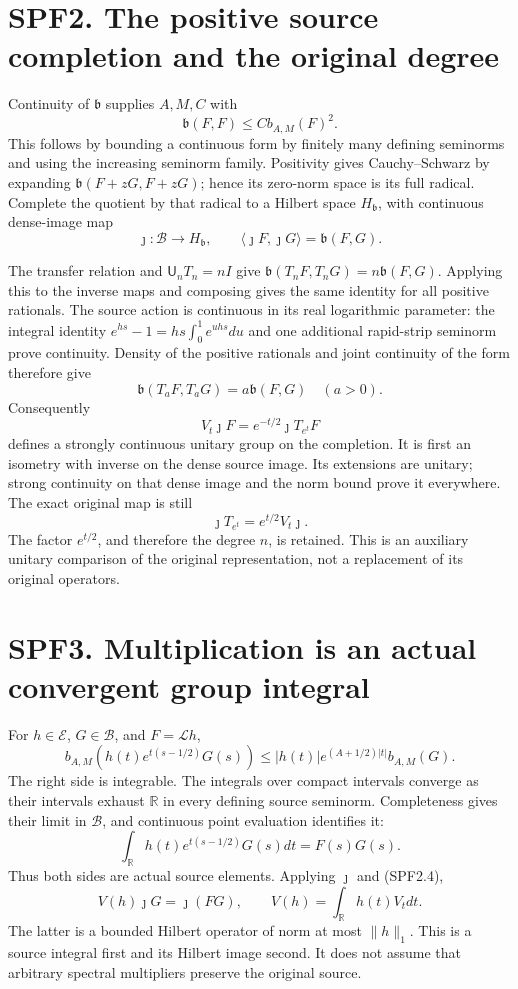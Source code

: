 \section{SPF2. The positive source completion and the original
degree}\label{spf2.-the-positive-source-completion-and-the-original-degree}

Continuity of \(\mathfrak b\) supplies \(A,M,C\) with \[
\mathfrak b(F,F)\le C b_{A,M}(F)^2.
\tag{SPF2.1}
\] This follows by bounding a continuous form by finitely many defining
seminorms and using the increasing seminorm family. Positivity gives
Cauchy--Schwarz by expanding \(\mathfrak b(F+zG,F+zG)\); hence its
zero-norm space is its full radical. Complete the quotient by that
radical to a Hilbert space \(H_{\mathfrak b}\), with continuous
dense-image map \[
\jmath:\mathcal B\longrightarrow H_{\mathfrak b},
\qquad\langle\jmath F,\jmath G\rangle=\mathfrak b(F,G).
\tag{SPF2.2}
\]

The transfer relation and \(\mathsf U_nT_n=nI\) give
\(\mathfrak b(T_nF,T_nG)=n\mathfrak b(F,G)\). Applying this to the
inverse maps and composing gives the same identity for all positive
rationals. The source action is continuous in its real logarithmic
parameter: the integral identity \(e^{hs}-1=hs\int_0^1e^{uhs}du\) and
one additional rapid-strip seminorm prove continuity. Density of the
positive rationals and joint continuity of the form therefore give \[
\mathfrak b(T_aF,T_aG)=a\mathfrak b(F,G)
\quad(a>0).
\tag{SPF2.3}
\] Consequently \[
V_t\jmath F=e^{-t/2}\jmath T_{e^t}F
\tag{SPF2.4}
\] defines a strongly continuous unitary group on the completion. It is
first an isometry with inverse on the dense source image. Its extensions
are unitary; strong continuity on that dense image and the norm bound
prove it everywhere. The exact original map is still \[
\boxed{\jmath T_{e^t}=e^{t/2}V_t\jmath.}
\tag{SPF2.5}
\] The factor \(e^{t/2}\), and therefore the degree \(n\), is retained.
This is an auxiliary unitary comparison of the original representation,
not a replacement of its original operators.

\section{SPF3. Multiplication is an actual convergent group
integral}\label{spf3.-multiplication-is-an-actual-convergent-group-integral}

For \(h\in\mathcal E\), \(G\in\mathcal B\), and \(F=\mathcal Lh\), \[
b_{A,M}(h(t)e^{t(s-1/2)}G(s))
\le |h(t)|e^{(A+1/2)|t|}b_{A,M}(G).
\tag{SPF3.1}
\] The right side is integrable. The integrals over compact intervals
converge as their intervals exhaust \(\mathbb R\) in every defining
source seminorm. Completeness gives their limit in \(\mathcal B\), and
continuous point evaluation identifies it: \[
\int_{\mathbb R}h(t)e^{t(s-1/2)}G(s)dt=F(s)G(s).
\tag{SPF3.2}
\] Thus both sides are actual source elements. Applying \(\jmath\) and
(SPF2.4), \[
\boxed{V(h)\jmath G=\jmath(FG),\qquad
V(h)=\int_{\mathbb R}h(t)V_tdt.}
\tag{SPF3.3}
\] The latter is a bounded Hilbert operator of norm at most \(\|h\|_1\).
This is a source integral first and its Hilbert image second. It does
not assume that arbitrary spectral multipliers preserve the original
source.

